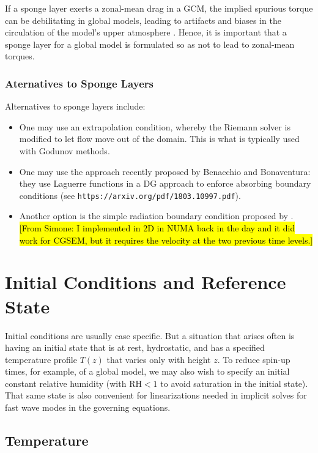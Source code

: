 \documentclass{report}
\begin{document}
If a sponge layer exerts a zonal-mean drag in a GCM, the implied spurious torque can be debilitating in global models, leading to artifacts and biases in the circulation of the model's upper atmosphere \citep[e.g.,][]{Shepherd96a}. Hence, it is important that a sponge layer for a global model is formulated so as not to lead to zonal-mean torques. 

\subsection{Aternatives to Sponge Layers}

Alternatives to sponge layers include:
\begin{itemize}
    \item One may use an extrapolation condition, whereby the Riemann solver is modified to let flow move out of the domain. This is what is typically used with Godunov methods. 
    \item One may use the approach recently proposed by Benacchio and Bonaventura: they use Laguerre functions in a DG approach to enforce absorbing boundary conditions (see \texttt{https://arxiv.org/pdf/1803.10997.pdf}).
    \item Another option is the simple radiation boundary condition proposed by \cite{orlanski1979}. \hl{[From Simone: I implemented in 2D in NUMA back in the day and it did work for CGSEM, but it requires the velocity at the two previous time levels.]}
\end{itemize}
    
\chapter{Initial Conditions and Reference State}\label{s:initial_conditions}

Initial conditions are usually case specific. But a situation that arises often is having an initial state that is at rest, hydrostatic, and has a specified temperature profile $T(z)$ that varies only with height $z$. To reduce spin-up times, for example, of a global model, we may also wish to specify an initial constant relative humidity (with $\mathrm{RH} < 1$ to avoid saturation in the initial state). That same state is also convenient for linearizations needed in implicit solves for fast wave modes in the governing equations.

\section{Temperature}
\end{document}
